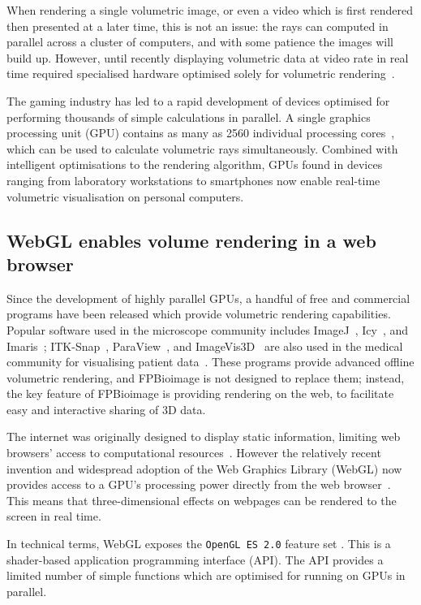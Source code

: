 When rendering a single volumetric image, or even a video which is first rendered then presented at a later time, this is not an issue: the rays can computed in parallel across a cluster of computers, and with some patience the images will build up. 
However, until recently displaying volumetric data at video rate in real time required specialised hardware optimised solely for volumetric rendering~\cite{ray2000resample}. 

The gaming industry has led to a rapid development of devices optimised for performing thousands of simple calculations in parallel. 
A single graphics processing unit (GPU) contains as many as 2560 individual processing cores~\cite{nvidia1080}, which can be used to calculate volumetric rays simultaneously. 
Combined with intelligent optimisations to the rendering algorithm, GPUs found in devices ranging from laboratory workstations to smartphones now enable real-time volumetric visualisation on personal computers. 

\subsection{WebGL enables volume rendering in a web browser}
Since the development of highly parallel GPUs, a handful of free and commercial programs have been released which provide volumetric rendering capabilities.
Popular software used in the microscope community includes ImageJ~\cite{schindelin2012fiji}, Icy~\cite{de2012icy}, and Imaris~\cite{imaris}; ITK-Snap~\cite{yushkevich2006user}, ParaView~\cite{ayachit2015paraview}, and ImageVis3D~\cite{imagevis3d2015interactive} are also used in the medical community for visualising patient data~\cite{madan2015creating}. 
These programs provide advanced offline volumetric rendering, and FPBioimage is not designed to replace them; instead, the key feature of FPBioimage is providing rendering on the web, to facilitate easy and interactive sharing of 3D data. 

The internet was originally designed to display static information, limiting web browsers' access to computational resources~\cite{leiner2009brief}.
However the relatively recent invention and widespread adoption of the Web Graphics Library (WebGL) now provides access to a GPU's processing power directly from the web browser~\cite{khronos2009webgl}. 
This means that three-dimensional effects on webpages can be rendered to the screen in real time.

In technical terms, WebGL exposes the \texttt{OpenGL ES 2.0} feature set \cite{khronos2009webgl}.
This is a shader-based application programming interface (API).
The API provides a limited number of simple functions which are optimised for running on GPUs in parallel. 

